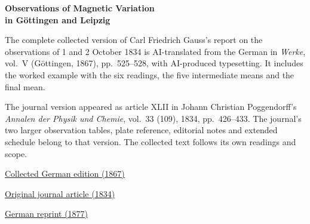 \clearpage
\thispagestyle{empty}
\begin{center}\Large\textbf{Observations of Magnetic Variation\\in Göttingen and Leipzig}\end{center}

The complete collected version of Carl Friedrich Gauss’s report on the observations of 1 and 2 October 1834 is AI-translated from the German in \textit{Werke}, vol.~V (Göttingen, 1867), pp.~525--528, with AI-produced typesetting. It includes the worked example with the six readings, the five intermediate means and the final mean.

The journal version appeared as article XLII in Johann Christian Poggendorff’s \textit{Annalen der Physik und Chemie}, vol.~33 (109), 1834, pp.~426--433. The journal’s two larger observation tables, plate reference, editorial notes and extended schedule belong to that version. The collected text follows its own readings and scope.

\medskip\noindent
\href{https://gdz.sub.uni-goettingen.de/id/PPN236006339}{Collected German edition (1867)}\par
\noindent\href{https://www.digitale-sammlungen.de/view/bsb10130346?page=440}{Original journal article (1834)}\par
\noindent\href{https://doi.org/10.1007/978-3-642-49319-5_29}{German reprint (1877)}
\clearpage
